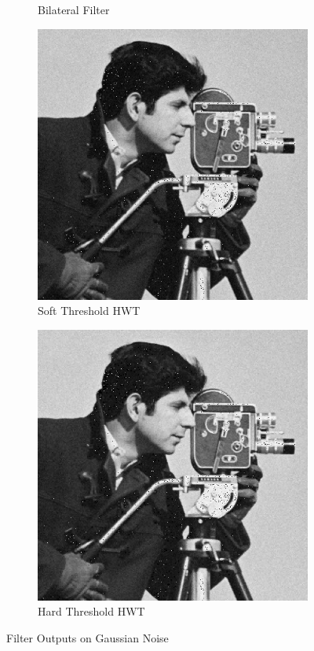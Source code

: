 \documentclass{article}\raggedbottom
\begin{document}
\begin{figure}[H]
\begin{subfigure}[b]{0.45\linewidth}
		\caption{Bilateral Filter}
	\end{subfigure}
	\begin{subfigure}[b]{0.45\linewidth}
		\includegraphics[width=\linewidth]{../../2_Software/data/IHWT_soft_g.png}
		\caption{Soft Threshold HWT}
	\end{subfigure}
	\begin{subfigure}[b]{0.45\linewidth}
		\includegraphics[width=\linewidth]{../../2_Software/data/IHWT_hard_g.png}
		\caption{Hard Threshold HWT}
	\end{subfigure}	
	\caption{Filter Outputs on Gaussian Noise}	
	\label{fig:filter_outputs_1}
\end{figure}
\end{document}
